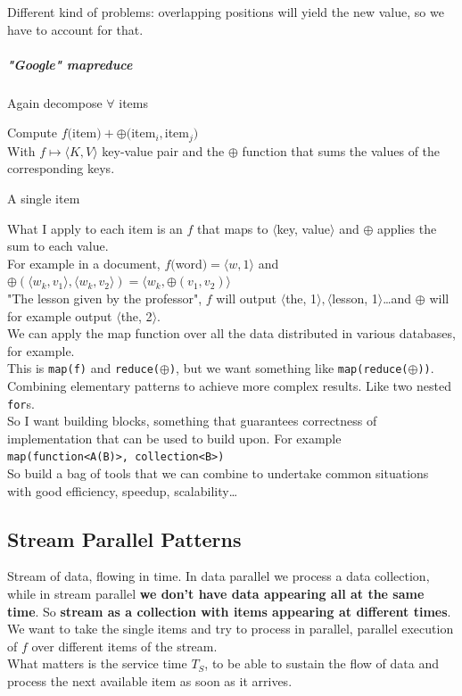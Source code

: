 \documentclass[10pt]{report}
\begin{document}
Different kind of problems: overlapping positions will yield the new value, so we have to account for that.
\subparagraph{"Google" mapreduce}
\begin{list}{}{}
	\item Again decompose $\forall$ items
	\item Compute $f($item$) + \oplus($item$_i, $item$_j)$\\
	With $f\mapsto \langle K, V\rangle$ key-value pair and the $\oplus$ function that sums the values of the corresponding keys.
	\item A single item
\end{list}
What I apply to each item is an $f$ that maps to $\langle$key, value$\rangle$ and $\oplus$ applies the sum to each value.\\
For example in a document, $f($word$)=\langle w,1\rangle$ and $\oplus(\langle w_k,v_1\rangle,\langle w_k,v_2\rangle) = \langle w_k, \oplus(v_1,v_2)\rangle$\\
"The lesson given by the professor", $f$ will output $\langle$the, 1$\rangle,\langle$lesson, 1$\rangle$\ldots and $\oplus$ will for example output $\langle$the, 2$\rangle$.\\
We can apply the map function over all the data distributed in various databases, for example.\\
This is \texttt{map(f)} and \texttt{reduce($\oplus$)}, but we want something like \texttt{map(reduce($\oplus$))}. Combining elementary patterns to achieve more complex results. Like two nested \texttt{for}s.\\
So I want building blocks, something that guarantees correctness of implementation that can be used to build upon. For example \texttt{map(function<A(B)>, collection<B>)}\\
So build a bag of tools that we can combine to undertake common situations with good efficiency, speedup, scalability\ldots
\subsection{Stream Parallel Patterns}
Stream of data, flowing in time. In data parallel we process a data collection, while in stream parallel \textbf{we don't have data appearing all at the same time}. So \textbf{stream as a collection with items appearing at different times}. We want to take the single items and try to process in parallel, parallel execution of $f$ over different items of the stream.\\
What matters is the service time $T_S$, to be able to sustain the flow of data and process the next available item as soon as it arrives.
\end{document}
